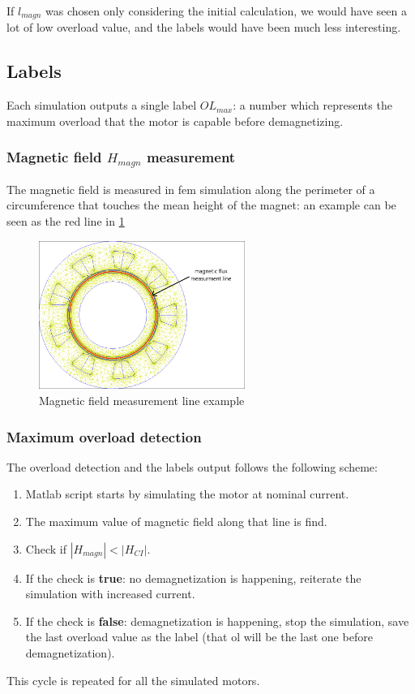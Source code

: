 If $l_{magn}$ was chosen only considering the initial calculation, we would have seen a lot of low overload value, and the labels would have been much less interesting.
\subsection{Labels}
Each simulation outputs a single label $OL_{max}$: a number which represents the maximum overload that the motor is capable before demagnetizing.
\subsubsection{Magnetic field \texorpdfstring{$H_{magn}$}{Hmagn} measurement}
The magnetic field is measured in \gls{fem} simulation along the perimeter of a circumference that touches the mean height of the magnet: an example can be seen as the red line in \cref{fig:measurment_line}
\begin{figure}[H]
    \centering
    \includegraphics[width=0.6\textwidth]{sections/images/section2/measurment_line.png}
    \caption{Magnetic field measurement line example}
    \label{fig:measurment_line}
\end{figure}
\subsubsection{Maximum overload detection}
The overload detection and the labels output follows the following scheme:
\begin{enumerate}
    \item Matlab script starts by simulating the motor at nominal current.
    \item The maximum value of magnetic field along that line is find.
    \item Check if $|H_{magn}|<|H_{CI}|$.
    \item If the check is \textbf{true}: no demagnetization is happening, reiterate the simulation with increased current.
    \item If the check is \textbf{false}: demagnetization is happening, stop the simulation, save the last overload value as the label (that \gls{ol} will be the last one before demagnetization).
\end{enumerate}
This cycle is repeated for all the simulated motors.
